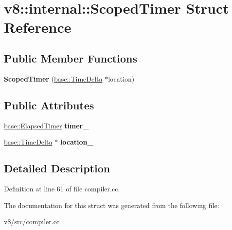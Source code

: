 \hypertarget{structv8_1_1internal_1_1ScopedTimer}{}\section{v8\+:\+:internal\+:\+:Scoped\+Timer Struct Reference}
\label{structv8_1_1internal_1_1ScopedTimer}
\subsection*{Public Member Functions}
\begin{DoxyCompactItemize}
\item 
\mbox{\label{structv8_1_1internal_1_1ScopedTimer_a78b2063ef5c2c50651a43769a522eaf1}} 
{\bfseries Scoped\+Timer} (\mbox{\hyperlink{classv8_1_1base_1_1TimeDelta}{base\+::\+Time\+Delta}} $\ast$location)
\end{DoxyCompactItemize}
\subsection*{Public Attributes}
\begin{DoxyCompactItemize}
\item 
\mbox{\label{structv8_1_1internal_1_1ScopedTimer_a0f38427e604d44f3c5c3b6ccd6cca4fa}} 
\mbox{\hyperlink{classv8_1_1base_1_1ElapsedTimer}{base\+::\+Elapsed\+Timer}} {\bfseries timer\+\_\+}
\item 
\mbox{\label{structv8_1_1internal_1_1ScopedTimer_ab6e7876ccdc4f67b79e9830e24f618ac}} 
\mbox{\hyperlink{classv8_1_1base_1_1TimeDelta}{base\+::\+Time\+Delta}} $\ast$ {\bfseries location\+\_\+}
\end{DoxyCompactItemize}


\subsection{Detailed Description}


Definition at line 61 of file compiler.\+cc.



The documentation for this struct was generated from the following file\+:\begin{DoxyCompactItemize}
\item 
v8/src/compiler.\+cc\end{DoxyCompactItemize}
